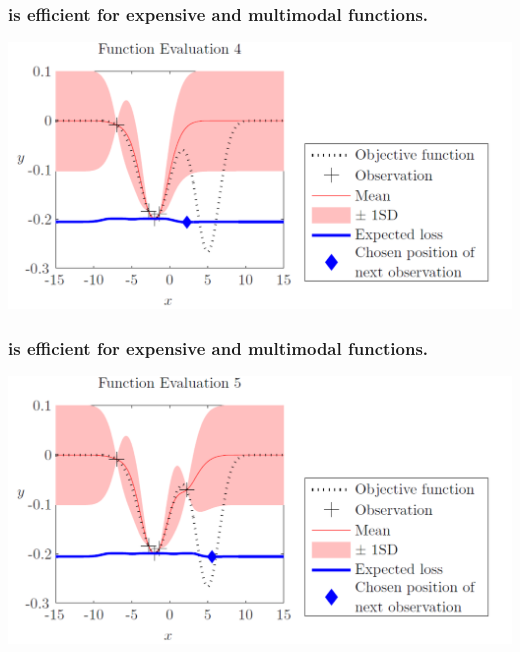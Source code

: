 \documentclass[12pt,onlymath]{beamer}
\begin{document}
\begin{frame}\frametitle{ is efficient for expensive and multimodal functions.}
\includegraphics[width = \textwidth]{./figures/bo4.pdf}
\end{frame}
\begin{frame}\frametitle{ is efficient for expensive and multimodal functions.}
\includegraphics[width = \textwidth]{./figures/bo5.pdf}
\end{frame}
\end{document}
